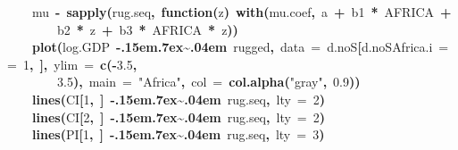 \documentclass{article}
\makeatletter
\newcommand{\hlnumber}[1]{\textcolor[rgb]{0,0,0}{#1}}%
\newcommand{\hlfunctioncall}[1]{\textcolor[rgb]{.5,0,.33}{\textbf{#1}}}%
\newcommand{\hlstring}[1]{\textcolor[rgb]{.6,.6,1}{#1}}%
\newcommand{\hlkeyword}[1]{\textbf{#1}}%
\newcommand{\hlargument}[1]{\textcolor[rgb]{.69,.25,.02}{#1}}%
\newcommand{\hlformalargs}[1]{\hlargument{#1}}%
\newcommand{\hlassignement}[1]{\textbf{#1}}%
\newcommand{\hlsymbol}[1]{#1}%
\def\urltilda{\kern -.15em\lower .7ex\hbox{\~{}}\kern .04em}%
\newcommand{\hlstd}[1]{\textcolor[rgb]{0,0,0}{#1}}%
\newenvironment{kframe}{%
 \def\FrameCommand##1{\hskip\@totalleftmargin \hskip-\fboxsep
 \colorbox{shadecolor}{##1}\hskip-\fboxsep
     \hskip-\linewidth \hskip-\@totalleftmargin \hskip\columnwidth}%
 \MakeFramed {\advance\hsize-\width
   \@totalleftmargin\z@ \linewidth\hsize
   \@setminipage}}%
 {\par\unskip\endMakeFramed}
\newenvironment{knitrout}{}{} %
\makeatother
\begin{document}
\begin{knitrout}
{\begin{kframe}
\begin{flushleft}
\hlstd{}{\ }{\ }{\ }{\ }\hlsymbol{mu}{\ }\hlassignement{\usebox{\hlnormalsizeboxlessthan}-}{\ }\hlfunctioncall{sapply}\hlkeyword{(}\hlsymbol{rug.seq}\hlkeyword{,}{\ }\hlkeyword{function}\hlkeyword{(}\hlformalargs{z}\hlkeyword{)}{\ }\hlfunctioncall{with}\hlkeyword{(}\hlsymbol{mu.coef}\hlkeyword{,}{\ }\hlsymbol{a}{\ }\hlkeyword{+}{\ }\hlsymbol{b1}{\ }\hlkeyword{*}{\ }\hlsymbol{AFRICA}{\ }\hlkeyword{+}\hspace*{\fill}\\
\hlstd{}{\ }{\ }{\ }{\ }{\ }{\ }{\ }{\ }\hlsymbol{b2}{\ }\hlkeyword{*}{\ }\hlsymbol{z}{\ }\hlkeyword{+}{\ }\hlsymbol{b3}{\ }\hlkeyword{*}{\ }\hlsymbol{AFRICA}{\ }\hlkeyword{*}{\ }\hlsymbol{z}\hlkeyword{)}\hlkeyword{)}\hspace*{\fill}\\
\hlstd{}{\ }{\ }{\ }{\ }\hlfunctioncall{plot}\hlkeyword{(}\hlsymbol{log.GDP}{\ }\hlkeyword{\urltilda{}}{\ }\hlsymbol{rugged}\hlkeyword{,}{\ }\hlargument{data}{\ }\hlargument{=}{\ }\hlsymbol{d.noS}\hlkeyword{[}\hlsymbol{d.noS}\hlkeyword{\usebox{\hlnormalsizeboxdollar}}\hlsymbol{Africa.i}{\ }=={\ }\hlnumber{1}\hlkeyword{,}{\ }\hlkeyword{]}\hlkeyword{,}{\ }\hlargument{ylim}{\ }\hlargument{=}{\ }\hlfunctioncall{c}\hlkeyword{(}\hlkeyword{-}\hlnumber{3.5}\hlkeyword{,}\hspace*{\fill}\\
\hlstd{}{\ }{\ }{\ }{\ }{\ }{\ }{\ }{\ }\hlnumber{3.5}\hlkeyword{)}\hlkeyword{,}{\ }\hlargument{main}{\ }\hlargument{=}{\ }\hlstring{"Africa"}\hlkeyword{,}{\ }\hlargument{col}{\ }\hlargument{=}{\ }\hlfunctioncall{col.alpha}\hlkeyword{(}\hlstring{"gray"}\hlkeyword{,}{\ }\hlnumber{0.9}\hlkeyword{)}\hlkeyword{)}\hspace*{\fill}\\
\hlstd{}{\ }{\ }{\ }{\ }\hlfunctioncall{lines}\hlkeyword{(}\hlsymbol{CI}\hlkeyword{[}\hlnumber{1}\hlkeyword{,}{\ }\hlkeyword{]}{\ }\hlkeyword{\urltilda{}}{\ }\hlsymbol{rug.seq}\hlkeyword{,}{\ }\hlargument{lty}{\ }\hlargument{=}{\ }\hlnumber{2}\hlkeyword{)}\hspace*{\fill}\\
\hlstd{}{\ }{\ }{\ }{\ }\hlfunctioncall{lines}\hlkeyword{(}\hlsymbol{CI}\hlkeyword{[}\hlnumber{2}\hlkeyword{,}{\ }\hlkeyword{]}{\ }\hlkeyword{\urltilda{}}{\ }\hlsymbol{rug.seq}\hlkeyword{,}{\ }\hlargument{lty}{\ }\hlargument{=}{\ }\hlnumber{2}\hlkeyword{)}\hspace*{\fill}\\
\hlstd{}{\ }{\ }{\ }{\ }\hlfunctioncall{lines}\hlkeyword{(}\hlsymbol{PI}\hlkeyword{[}\hlnumber{1}\hlkeyword{,}{\ }\hlkeyword{]}{\ }\hlkeyword{\urltilda{}}{\ }\hlsymbol{rug.seq}\hlkeyword{,}{\ }\hlargument{lty}{\ }\hlargument{=}{\ }\hlnumber{3}\hlkeyword{)}\hspace*{\fill}\\

\end{flushleft}
\end{kframe}}
\end{knitrout}
\end{document}
